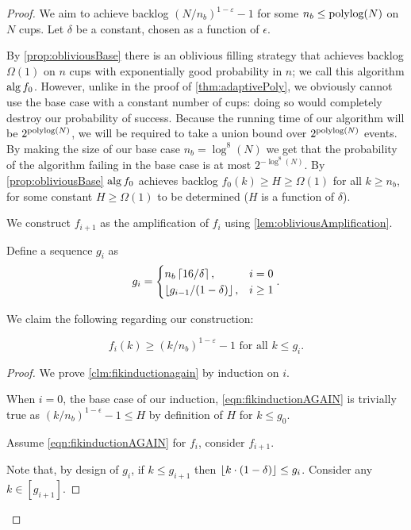 \begin{proof}
  We aim to achieve backlog $(N/n_b)^{1-\varepsilon}-1$ for some
  $n_b \le \operatorname{\text{polylog}}(N)$ on $N$ cups.
  Let $\delta$ be a constant, chosen as a function of $\epsilon$.

  By \cref{prop:obliviousBase} there is an oblivious filling
  strategy that achieves backlog $\Omega(1)$ on $n$ cups with
  exponentially good probability in $n$; we call this algorithm
  $\operatorname{\text{\textup{alg}}}{f_0}$. However, unlike in the proof of
  \cref{thm:adaptivePoly}, we obviously cannot use the base case
  with a constant number of cups: doing so would completely
  destroy our probability of success. Because the running time of
  our algorithm will be $2^{\operatorname{\text{polylog}}(N)}$, we will be required to
  take a union bound over $2^{\operatorname{\text{polylog}}(N)}$ events. By making the
  size of our base case $n_b = \log^8(N)$ we get that the
  probability of the algorithm failing in the base case is at
  most $2^{-\log^8(N)}$. By \cref{prop:obliviousBase} $\operatorname{\text{\textup{alg}}}{f_0}$ achieves
  backlog $f_0(k) \ge H \ge \Omega(1)$ for all $k \ge n_b$, for
  some constant $H \ge \Omega(1)$ to be determined ($H$ is a
  function of $\delta$).

  We construct $f_{i+1}$ as the amplification of $f_i$ using
  \cref{lem:obliviousAmplification}.

  Define a sequence $g_i$ as 
  $$g_i =
  \begin{cases}
    n_b\left\lceil 16/\delta \right\rceil, & i=0\\
    \left\lfloor  g_{i-1}/(1-\delta)  \right\rfloor, & i\ge 1 
  \end{cases}.$$

  We claim the following regarding our construction:
  \begin{clm}
    \label{clm:fikinductionagain}
    \begin{equation}
      f_i(k) \ge (k/n_b)^{1-\varepsilon} - 1 \text{ for all } k \le g_i. \label{eqn:fikinductionAGAIN}
    \end{equation}
  \end{clm}
  \begin{proof}
  We prove \cref{clm:fikinductionagain} by induction on $i$. 

  When $i=0$, the base case of our induction,
  \eqref{eqn:fikinductionAGAIN} is trivially true as
  $(k/n_b)^{1-\epsilon} - 1 \le H$ by definition of $H$ for $k\le g_0$.

  Assume \eqref{eqn:fikinductionAGAIN} for $f_i$, consider $f_{i+1}$. 

  Note that, by design of $g_i$, if $k \le g_{i+1}$ then $\left\lfloor k\cdot (1-\delta) \right\rfloor \le g_i$.
  Consider any $k\in [g_{i+1}]$. 


\end{proof}
\end{proof}
